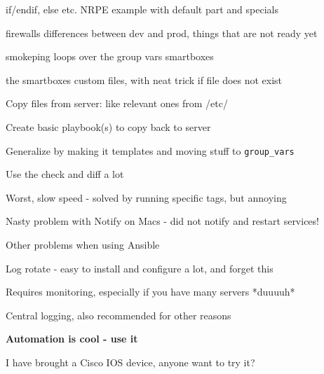 \documentclass[18pt,landscape,a4paper,footrule]{foils}
\begin{document}
if/endif, else etc. NRPE example with default part and specials

firewalls differences between dev and prod, things that are not ready yet

smokeping loops over the group vars smartboxes

the smartboxes custom files, with neat trick if file does not exist



\begin{list2}
\item Copy files from server: like relevant ones from /etc/
\item Create basic playbook(s) to copy back to server
\item Generalize by making it templates and moving stuff to \verb+group_vars+
\end{list2}

\centerline{Use the check and diff a lot \smiley}



\begin{list2}
\item Worst, slow speed - solved by running specific tags, but annoying
\item Nasty problem with Notify on Macs - did not notify and restart services!
\end{list2}


Other problems when using Ansible

\begin{list2}
\item Log rotate - easy to install and configure a lot, and forget this
\item Requires monitoring, especially if you have many servers *duuuuh*
\item Central logging, also recommended for other reasons
\end{list2}



\begin{center}
\vskip 5mm
{\color{titlecolor}\LARGE \bf Automation is cool - use it}
\vskip 5mm

\end{center}



I have brought a Cisco IOS device, anyone want to try it?\\
\end{document}
